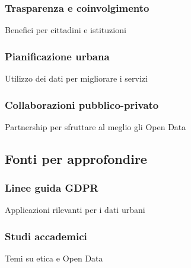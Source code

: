 \subsubsection{Trasparenza e coinvolgimento}
Benefici per cittadini e istituzioni

\subsubsection{Pianificazione urbana}
Utilizzo dei dati per migliorare i servizi

\subsubsection{Collaborazioni pubblico-privato}
Partnership per sfruttare al meglio gli Open Data

\subsection{Fonti per approfondire}
\subsubsection{Linee guida GDPR}
Applicazioni rilevanti per i dati urbani

\subsubsection{Studi accademici}
Temi su etica e Open Data